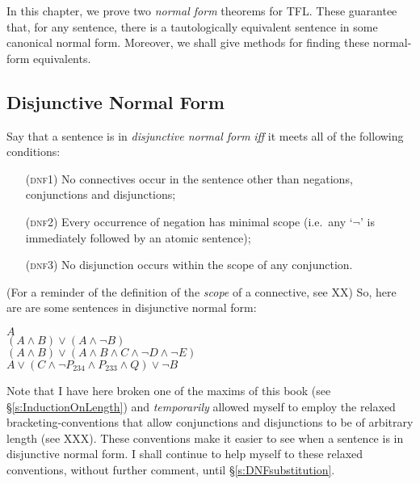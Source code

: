 
\newcommand*{\define}[1]{\emph{#1}}


%




In this chapter, we prove two \emph{normal form} theorems for TFL. These guarantee that, for any sentence, there is a tautologically equivalent sentence in some canonical normal form. Moreover, we shall give methods for finding these normal-form equivalents.

\subsection{Disjunctive Normal Form}%

Say that a sentence is in \define{disjunctive normal form} \emph{iff} it meets all of the following conditions:
	\begin{itemize}
		\item[(\textsc{dnf1})] No connectives occur in the sentence other than negations, conjunctions and disjunctions;
		\item[(\textsc{dnf2})] Every occurrence of negation has minimal scope (i.e.\ any `$\lnot$' is immediately followed by an atomic sentence);
		\item[(\textsc{dnf3})] No disjunction occurs within the scope of any conjunction.
	\end{itemize}
(For a reminder of the definition of the \define{scope} of a connective, see XX) So, here are are some sentences in disjunctive normal form:
	\begin{center}
		$A$\\
		$(A \land B) \lor (A \land \lnot B)$\\
		$(A \land B) \lor (A \land  B \land C \land \lnot D \land \lnot E)$\\
		$A \lor (C \land \lnot P_{234} \land P_{233} \land Q) \lor \lnot B$
	\end{center}
Note that I have here broken one of the maxims of this book (see \S\ref{s:InductionOnLength}) and \emph{temporarily} allowed myself to employ the relaxed bracketing-conventions that allow conjunctions and disjunctions to be of arbitrary length (see XXX). These conventions make it easier to see when a sentence is in disjunctive normal form. I shall continue to help myself to these relaxed conventions, without further comment, until \S\ref{s:DNFsubstitution}. 


